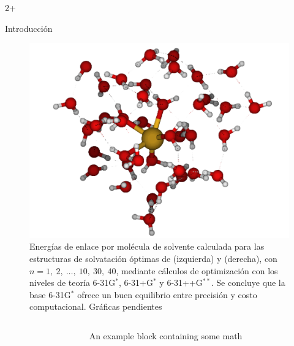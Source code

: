 \documentclass[final]{beamer}
\newlength{\sepwidth}
\newlength{\colwidth}
\newcommand{\separatorcolumn}{\begin{column}{\sepwidth}\end{column}}
\begin{document}
\begin{frame}[t]
\begin{columns}[t]
\begin{column}{2\colwidth+\sepwidth}
\begin{alertblock}{Introducción}
\begin{figure}[H]
\begin{minipage}[b]{0.25\textwidth}
						\includegraphics[width=\textwidth]{logos/Cu-40H2O.png}
					\end{minipage}

					\caption{Energías de enlace por molécula de solvente calculada para las estructuras de solvatación óptimas de  (izquierda) y  (derecha), con $n = 1,\ 2,\ \ldots,\ 10,\ 30,\ 40$, mediante cálculos de optimización con los niveles de teoría 6-31G$^\ast$, 6-31+G$^\ast$ y 6-31++G$^{\ast\ast}$. Se concluye que la base 6-31G$^\ast$ ofrece un buen equilibrio entre precisión y costo computacional. Gráficas pendientes}
					\label{fig:bases}
				\end{figure}


			\end{alertblock}
		\end{column}

	\end{columns}

	\begin{columns}[t]

		\separatorcolumn
		
		\begin{column}{\colwidth}
			
			\begin{block}{An example block containing some math}{}


\end{block}
\end{column}
\end{columns}
\end{frame}
\end{document}
